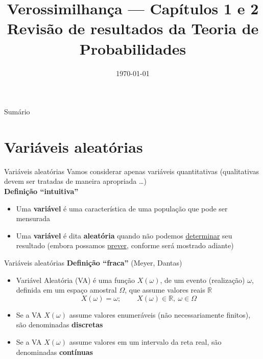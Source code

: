 \documentclass[10pt]{beamer}\usepackage{graphicx, color}
\title[Verossimilhança]{Verossimilhança --- Capítulos 1 e 2\\
  Revisão de resultados da Teoria de Probabilidades}
\author[MATH 232]{}
\date{\today}
\begin{document}
\begin{frame}
\maketitle
\end{frame}

\begin{frame}{Sumário}
\tableofcontents
\end{frame}

\section{Variáveis aleatórias}
\label{sec:va}

\begin{frame}{Variáveis aleatórias}
  Vamos considerar apenas variáveis quantitativas (qualitativas devem
  ser tratadas de maneira apropriada \ldots)\\
  \textbf{Definição ``intuitiva''}
  \begin{itemize}
  \item Uma \textbf{variável} é uma característica de uma população que
    pode ser mensurada
  \item Uma \textbf{variável} é dita \textbf{aleatória} quando não
    podemos \underline{determinar} seu resultado (embora possamos
    \underline{prever}, conforme será mostrado adiante)
  \end{itemize}
\end{frame}

\begin{frame}{Variáveis aleatórias}
  \textbf{Definição ``fraca''} (Meyer, Dantas)
  \begin{itemize}
  \item Variável Aleatória (VA) é uma função $X(\omega)$, de um evento
    (realização) $\omega$, definida em um espaço
    amostral $\Omega$, que assume valores reais $\mathbb{R}$
    \begin{equation*}
      X(\omega) = \omega;\ \qquad X(\omega) \in \mathbb{R},\ \omega
      \in \Omega
    \end{equation*}
  \item Se a VA $X(\omega)$ assume valores enumeráveis (não
    necessariamente finitos), são denominadas \textbf{discretas}
  \item Se a VA $X(\omega)$ assume valores em um intervalo da reta real,
    são denominadas \textbf{contínuas}
  \end{itemize}
\end{frame}
\end{document}
